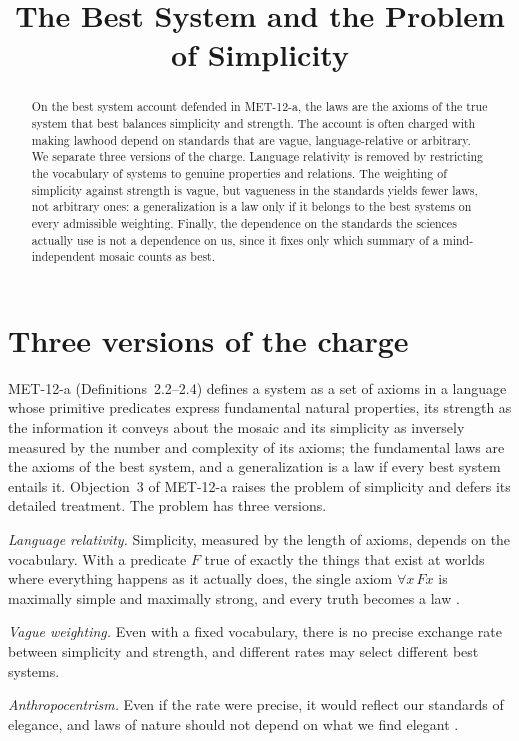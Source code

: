 \documentclass{situationist-preprint}
\title{The Best System and the Problem of Simplicity}
\begin{document}
\maketitle

\begin{abstract}
On the best system account defended in MET-12-a, the laws are the axioms of the true system that best balances simplicity and strength. The account is often charged with making lawhood depend on standards that are vague, language-relative or arbitrary. We separate three versions of the charge. Language relativity is removed by restricting the vocabulary of systems to genuine properties and relations. The weighting of simplicity against strength is vague, but vagueness in the standards yields fewer laws, not arbitrary ones: a generalization is a law only if it belongs to the best systems on every admissible weighting. Finally, the dependence on the standards the sciences actually use is not a dependence on us, since it fixes only which summary of a mind-independent mosaic counts as best.
\end{abstract}

\section{Three versions of the charge}

MET-12-a (Definitions~2.2--2.4) defines a system as a set of axioms in a language whose primitive predicates express fundamental natural properties, its strength as the information it conveys about the mosaic and its simplicity as inversely measured by the number and complexity of its axioms; the fundamental laws are the axioms of the best system, and a generalization is a law if every best system entails it. Objection~3 of MET-12-a raises the problem of simplicity and defers its detailed treatment. The problem has three versions.

\emph{Language relativity.} Simplicity, measured by the length of axioms, depends on the vocabulary. With a predicate $F$ true of exactly the things that exist at worlds where everything happens as it actually does, the single axiom $\forall x\, Fx$ is maximally simple and maximally strong, and every truth becomes a law \citep{Lewis1983}.

\emph{Vague weighting.} Even with a fixed vocabulary, there is no precise exchange rate between simplicity and strength, and different rates may select different best systems.

\emph{Anthropocentrism.} Even if the rate were precise, it would reflect our standards of elegance, and laws of nature should not depend on what we find elegant \citep{vanFraassen1989}.
\end{document}
